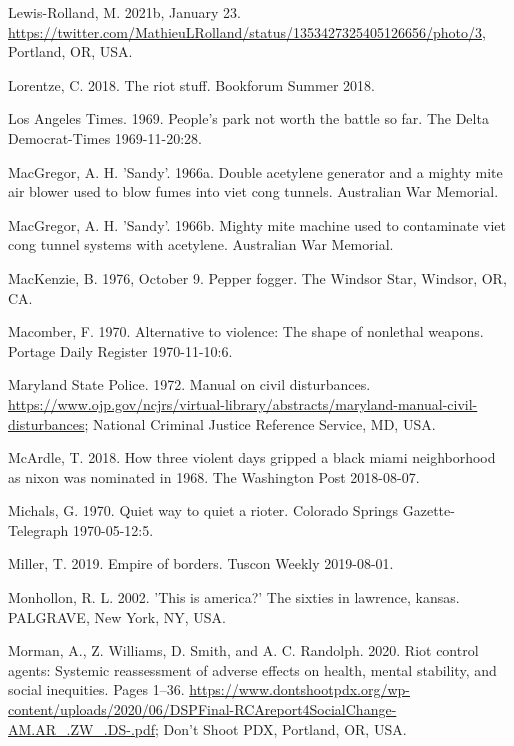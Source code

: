 \documentclass[
  11pt,
]{krantz}
\newlength{\cslhangindent}
\newlength{\cslentryspacingunit} %
\newenvironment{CSLReferences}[2] %
 {%
  \setlength{\parindent}{0pt}
  \ifodd #1
  \let\oldpar\par
  \def\par{\hangindent=\cslhangindent\oldpar}
  \fi
  \setlength{\parskip}{#2\cslentryspacingunit}
 }%
 {}
\begin{document}
\begin{CSLReferences}{1}{0}
\leavevmode{}%
Lewis-Rolland, M. 2021b, January 23. \url{https://twitter.com/MathieuLRolland/status/1353427325405126656/photo/3}, Portland, OR, USA.

\leavevmode{}%
Lorentze, C. 2018. The riot stuff. Bookforum Summer 2018.

\leavevmode{}%
Los Angeles Times. 1969. People's park not worth the battle so far. The Delta Democrat-Times 1969-11-20:28.

\leavevmode{}%
MacGregor, A. H. 'Sandy'. 1966a. Double acetylene generator and a mighty mite air blower used to blow fumes into viet cong tunnels. Australian War Memorial.

\leavevmode{}%
MacGregor, A. H. 'Sandy'. 1966b. Mighty mite machine used to contaminate viet cong tunnel systems with acetylene. Australian War Memorial.

\leavevmode{}%
MacKenzie, B. 1976, October 9. Pepper fogger. The Windsor Star, Windsor, OR, CA.

\leavevmode{}%
Macomber, F. 1970. Alternative to violence: The shape of nonlethal weapons. Portage Daily Register 1970-11-10:6.

\leavevmode{}%
Maryland State Police. 1972. Manual on civil disturbances. \url{https://www.ojp.gov/ncjrs/virtual-library/abstracts/maryland-manual-civil-disturbances}; National Criminal Justice Reference Service, MD, USA.

\leavevmode{}%
McArdle, T. 2018. How three violent days gripped a black miami neighborhood as nixon was nominated in 1968. The Washington Post 2018-08-07.

\leavevmode{}%
Michals, G. 1970. Quiet way to quiet a rioter. Colorado Springs Gazette-Telegraph 1970-05-12:5.

\leavevmode{}%
Miller, T. 2019. Empire of borders. Tuscon Weekly 2019-08-01.

\leavevmode{}%
Monhollon, R. L. 2002. 'This is america?' The sixties in lawrence, kansas. PALGRAVE, New York, NY, USA.

\leavevmode{}%
Morman, A., Z. Williams, D. Smith, and A. C. Randolph. 2020. Riot control agents: Systemic reassessment of adverse effects on health, mental stability, and social inequities. Pages 1--36. \url{https://www.dontshootpdx.org/wp-content/uploads/2020/06/DSPFinal-RCAreport4SocialChange-AM.AR_.ZW_.DS-.pdf}; Don't Shoot PDX, Portland, OR, USA.


\end{CSLReferences}
\end{document}
